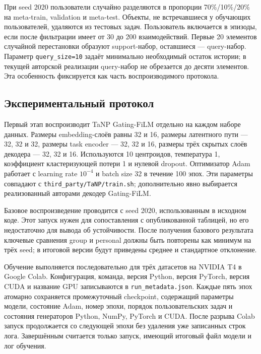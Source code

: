 \documentclass[12pt,a4paper]{article}
\begin{document}
При seed 2020 пользователи случайно разделяются в пропорции 70\%/10\%/20\% на
meta-train, validation и meta-test. Объекты, не встречавшиеся у обучающих
пользователей, удаляются из тестовых задач. Пользователь включается в эпизоды,
если после фильтрации имеет от 30 до 200 взаимодействий. Первые 20 элементов
случайной перестановки образуют support-набор, оставшиеся --- query-набор.
Параметр \texttt{query\_size=10} задаёт минимально необходимый остаток истории; в
текущей авторской реализации query-набор не обрезается до десяти элементов.
Эта особенность фиксируется как часть воспроизводимого протокола.

\subsection{Экспериментальный протокол}

Первый этап воспроизводит TaNP Gating-FiLM отдельно на каждом наборе данных.
Размеры embedding-слоёв равны 32 и 16, размеры латентного пути --- 32, 32 и
32, размеры task encoder --- 32, 32 и 16, размеры трёх скрытых слоёв декодера
--- 32, 32 и 16. Используются 10 центроидов, температура 1, коэффициент
кластеризующей потери 1 и нулевой dropout. Оптимизатор Adam работает с
learning rate $10^{-4}$ и batch size 32 в течение 100 эпох. Эти параметры
совпадают с \texttt{third\_party/TaNP/train.sh}; дополнительно явно выбирается
реализованный авторами декодер Gating-FiLM.

Базовое воспроизведение проводится с seed 2020, использованным в исходном
коде. Этот запуск нужен для сопоставления с опубликованной таблицей, но его
недостаточно для вывода об устойчивости. После получения базового результата
ключевые сравнения group и personal должны быть повторены как минимум на трёх
seed; в итоговой версии будут приведены среднее и стандартное отклонение.

Обучение выполняется последовательно для трёх датасетов на NVIDIA T4 в Google
Colab. Конфигурация, команда, версия Python, версия PyTorch, версия CUDA и
название GPU записываются в \texttt{run\_metadata.json}. Каждые пять эпох атомарно
сохраняется промежуточный checkpoint, содержащий параметры модели, состояние
Adam, номер эпохи, порядок пользовательских задач и состояния генераторов
Python, NumPy, PyTorch и CUDA. После разрыва Colab запуск продолжается со
следующей эпохи без удаления уже записанных строк лога. Завершённым считается
только запуск, имеющий итоговый файл модели и лог обучения.
\end{document}
